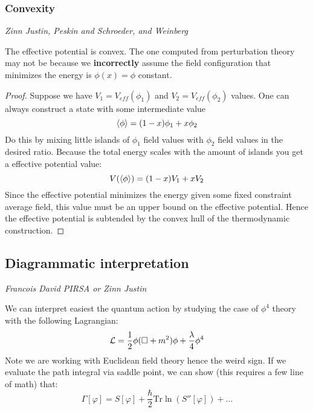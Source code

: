 \documentclass[11pt]{scrartcl}
\begin{document}
\subsubsection{Convexity}
\emph{Zinn Justin, Peskin and Schroeder, and Weinberg}

The effective potential is convex.  The one computed from perturbation theory may not be because we \textbf{incorrectly} assume the field configuration that minimizes the energy is $\phi(x) = \phi$ constant.

\begin{proof}
	Suppose we have $V_1 = V_{eff}(\phi_1)$ and $V_2 = V_{eff} (\phi_2)$ values.
	One can always construct a state with some intermediate value
	\[ \braket{\phi} = (1-x) \phi_1 + x \phi_2 \]
	Do this by mixing little islands of $\phi_1$ field values with $\phi_2$ field values in the desired ratio.  Because the total energy scales with the amount of islands you get a effective potential value:
	\[ V(\braket{\phi}) = (1-x) V_1 + x V_2 \]
	Since the effective potential minimizes the energy given some fixed constraint average field, this value must be an upper bound on the effective potential.  Hence the effective potential is subtended by the convex hull of the thermodynamic construction.
\end{proof}

\subsection{Diagrammatic interpretation}

\emph{Francois David PIRSA or Zinn Justin}


We can interpret easiest the quantum action by studying the case of $\phi^4$ theory with the following Lagrangian:
$$ \mathcal{L} = \frac12 \phi( \Box   + m^2) \phi + {\lambda \over 4} \phi^4$$
Note we are working with Euclidean field theory hence the weird sign.
If we evaluate the path integral via saddle point, we can show (this requires a few line of math) that:
$$\boxed{\Gamma[\varphi] = S[\varphi] + \frac{ \hbar}{2} \text{Tr} \ln(S''[\varphi]) + ...}$$
\end{document}
